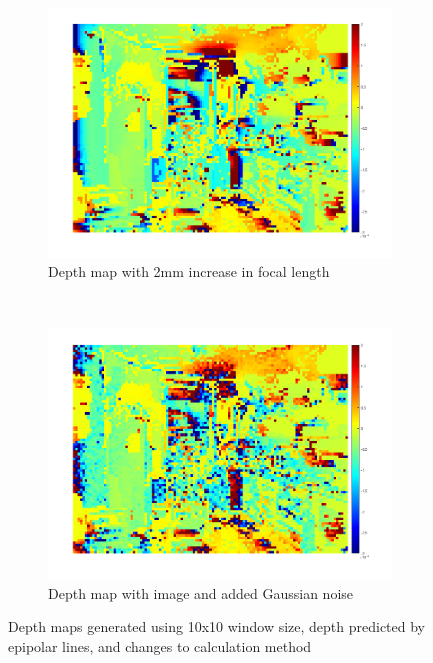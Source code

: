 \documentclass[a4paper, 10pt, conference]{ieeeconf}
\begin{document}
\begin{figure}[!ht]
  \captionsetup[subfigure]{position=b}
  \centering
    \begin{subfigure}{0.45\linewidth}
      \includegraphics[width=\textwidth]{pic/q2_2_e_focal2}
      \caption{Depth map with 2mm increase in focal length}
    \end{subfigure}
    ~
    \begin{subfigure}{0.45\linewidth}
      \includegraphics[width=\textwidth]{pic/q2_2_e_gaussian}
      \caption{Depth map with image and added Gaussian noise}
    \end{subfigure}

  \caption{Depth maps generated using 10x10 window size, depth predicted by epipolar lines, and changes to calculation method}
  \label{fig:depthChanges}
\end{figure}
\end{document}
